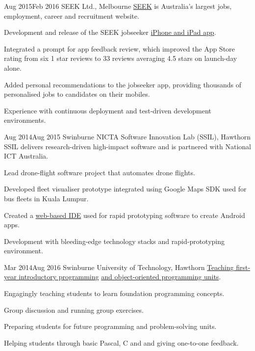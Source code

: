 \clearpage

{Aug 2015}{Feb 2016}
{SEEK Ltd., Melbourne}
{\href{http://seek.com.au}{SEEK} is Australia's largest jobs, employment, career and recruitment website.}
{
  \item Development and release of the SEEK jobseeker \href{https://itunes.apple.com/us/app/seek-jobs/id520400855?mt=8}{iPhone and iPad app}.
  \item Integrated a prompt for app feedback review, which improved the App Store rating from six 1 star reviews to 33 reviews averaging 4.5 stars on launch-day alone.
  \item Added personal recommendations to the jobseeker app, providing thousands of personalised jobs to candidates on their mobiles.
  \item Experience with continuous deployment and test-driven development environments.
}

{Aug 2014}{Aug 2015}
{Swinburne NICTA Software Innovation Lab (SSIL), Hawthorn}
{SSIL delivers research-driven high-impact software and is partnered with National ICT Australia.}
{
  \item Lead drone-flight software project that automates drone flights.
  \item Developed fleet visualiser prototype integrated using Google Maps SDK used for bus fleets in Kuala Lumpur.
  \item Created a \href{http://rappt.io/}{web-based IDE} used for rapid prototyping software to create Android apps.
  \item Development with bleeding-edge technology stacks and rapid-prototyping environment.
}

{Mar 2014}{Aug 2016}
{Swinburne University of Technology, Hawthorn}
{\href{http://www.swinburne.edu.au/study/courses/units/Introduction-to-Programming-COS10009/local}{Teaching first-year introductory programming} \href{http://www.swinburne.edu.au/study/courses/units/Object-Oriented-Programming-COS70006/local}{and object-oriented programming units}.}
{
  \item Engagingly teaching students to learn foundation programming concepts.
  \item Group discussion and running group exercises.
  \item Preparing students for future programming and problem-solving units.
  \item Helping students through basic Pascal, C and \Csh\hspace{0.25ex}and giving one-to-one feedback.
}

